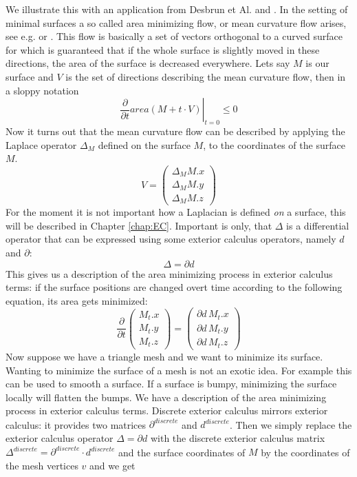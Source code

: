 We illustrate this with an application from Desbrun et Al. \cite{Desbrun:1999:IFI:311535.311576} and \cite{laplacebeltrami}. In the setting of minimal surfaces a so called area minimizing flow, or mean curvature flow arises, see e.g. \cite{carmo1992differentialgeometrie} or \cite{2011arXiv1102.1411C}. This flow is basically a set of vectors orthogonal to a curved surface for which is guaranteed that if the whole surface is slightly moved in these directions, the area of the surface is decreased everywhere. Lets say $M$ is our surface and $V$ is the set of directions describing the mean curvature flow, then in a sloppy notation
\[\left. \frac{\partial}{\partial t} area(M + t\cdot V) \right|_{t=0}\leq 0\]
Now it turns out that the mean curvature flow can be described by applying the Laplace operator $\Delta_M$ defined on the surface $M$, to the coordinates of the surface $M$. 
\[V = \begin{pmatrix}
\Delta_M M.x \\
\Delta_M M.y \\
\Delta_M M.z
\end{pmatrix}\]
For the moment it is not important how a Laplacian is defined \emph{on} a surface, this will be described in Chapter \ref{chap:EC}. Important is only, that $\Delta$ is a differential operator that can be expressed using some exterior calculus operators, namely $d$ and $\partial$: 
\[\Delta = \partial d\]
This gives us a description of the area minimizing process in exterior calculus terms: if the surface positions are changed overt time according to the following equation, its area gets minimized:
\[\frac{\partial}{\partial t} \begin{pmatrix}
M_t.x \\
M_t.y \\
 M_t.z
\end{pmatrix} = \begin{pmatrix}
\partial d \,M_t.x \\
\partial d\, M_t.y \\
\partial d\, M_t.z
\end{pmatrix}\]
Now suppose we have a triangle mesh and we want to minimize its surface. Wanting to minimize the surface of a mesh is not an exotic idea. For example this can be used to smooth a surface. If a surface is bumpy, minimizing the surface locally will flatten the bumps. We have a description of the area minimizing process in exterior calculus terms. Discrete exterior calculus mirrors exterior calculus: it provides two matrices $\partial^{discrete}$ and $d^{discrete}$. Then we simply replace the exterior calculus operator $\Delta = \partial d$ with the  discrete exterior calculus matrix $\Delta^{discrete} = \partial^{discrete} \cdot d^{discrete}$ and the surface coordinates of $M$ by the coordinates of the mesh vertices $v$ and we get
